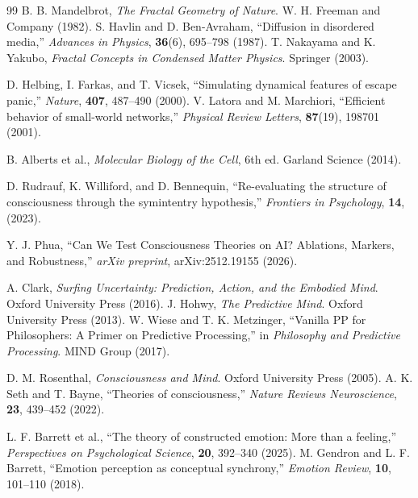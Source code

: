 \documentclass[12pt,a4paper]{article}
\begin{document}
\begin{thebibliography}{99}
			 B. B. Mandelbrot, \emph{The Fractal Geometry of Nature}. W. H. Freeman and Company (1982).
			 S. Havlin and D. Ben-Avraham, ``Diffusion in disordered media,'' \emph{Advances in Physics}, \textbf{36}(6), 695--798 (1987).
			 T. Nakayama and K. Yakubo, \emph{Fractal Concepts in Condensed Matter Physics}. Springer (2003).
			
			 D. Helbing, I. Farkas, and T. Vicsek, ``Simulating dynamical features of escape panic,'' \emph{Nature}, \textbf{407}, 487--490 (2000).
			 V. Latora and M. Marchiori, ``Efficient behavior of small-world networks,'' \emph{Physical Review Letters}, \textbf{87}(19), 198701 (2001).
			
			 B. Alberts et al., \emph{Molecular Biology of the Cell}, 6th ed. Garland Science (2014).
			
			 D. Rudrauf, K. Williford, and D. Bennequin, ``Re-evaluating the structure of consciousness through the symintentry hypothesis,'' \emph{Frontiers in Psychology}, \textbf{14}, (2023).
			
			 Y. J. Phua, ``Can We Test Consciousness Theories on AI? Ablations, Markers, and Robustness,'' \emph{arXiv preprint}, arXiv:2512.19155 (2026).
			
			 A. Clark, \emph{Surfing Uncertainty: Prediction, Action, and the Embodied Mind}. Oxford University Press (2016).
			 J. Hohwy, \emph{The Predictive Mind}. Oxford University Press (2013).
			 W. Wiese and T. K. Metzinger, ``Vanilla PP for Philosophers: A Primer on Predictive Processing,'' in \emph{Philosophy and Predictive Processing}. MIND Group (2017).
			
			 D. M. Rosenthal, \emph{Consciousness and Mind}. Oxford University Press (2005).
			 A. K. Seth and T. Bayne, ``Theories of consciousness,'' \emph{Nature Reviews Neuroscience}, \textbf{23}, 439--452 (2022).
			
			 L. F. Barrett et al., ``The theory of constructed emotion: More than a feeling,'' \emph{Perspectives on Psychological Science}, \textbf{20}, 392--340 (2025).
			 M. Gendron and L. F. Barrett, ``Emotion perception as conceptual synchrony,'' \emph{Emotion Review}, \textbf{10}, 101--110 (2018).
			

\end{thebibliography}
\end{document}
